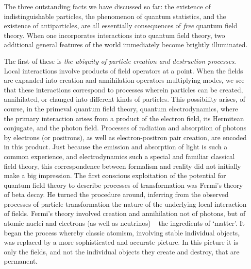 \documentclass[aps,epsf]{revtex4}
\begin{document}
The three outstanding facts we have
discussed so far: the existence of indistinguishable particles, the
phenomenon of quantum statistics, and the existence of antiparticles,
are all essentially consequences of {\it free\/} quantum field theory.
When one incorporates interactions into quantum field theory, two
additional general features of the world immediately become brightly
illuminated.  

The first of these is {\it the ubiquity of particle
creation and destruction processes}.  Local interactions involve
products of field operators at a point.  When the fields are expanded
into creation and annihilation operators multiplying modes, we see
that these interactions correspond to processes wherein particles can
be created, annihilated, or changed into different kinds of particles.
This possibility arises, of course, in the primeval quantum field
theory, quantum electrodynamics, where the primary interaction arises
from a product of the electron field, its Hermitean conjugate, and the
photon field.  Processes of radiation and absorption of photons by
electrons (or positrons), as well as electron-positron pair creation,
are encoded in this product. Just because the emission and absorption
of light is such a common experience, and electrodynamics such a
special and familiar classical field theory, this correspondence
between formalism and reality did not initially make a big
impression. The first conscious exploitation of the potential for
quantum field theory to describe processes of transformation was
Fermi's theory of beta decay.  He turned the procedure around,
inferring from the observed processes of particle transformation the
nature of the underlying local interaction of fields.  Fermi's
theory involved creation and annihilation not of photons, but of
atomic nuclei and electrons (as well as neutrinos) -- the ingredients
of `matter'.  It began the process whereby classic atomism,
involving stable individual objects, was replaced by a more
sophisticated and accurate picture.  In this picture it is only the
fields, and not the individual objects they create and destroy, that
are permanent.  
\end{document}
